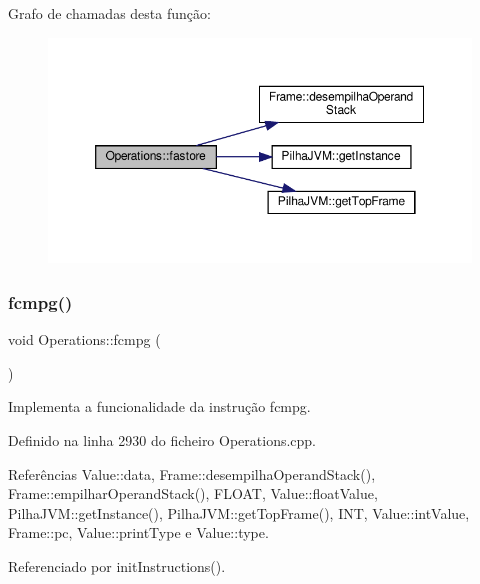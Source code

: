 Grafo de chamadas desta função\+:\nopagebreak
\begin{figure}[H]
\begin{center}
\leavevmode
\includegraphics[width=350pt]{classOperations_aa8a2c3048379b9d5cdc2b4611ef86190_cgraph}
\end{center}
\end{figure}
\mbox{\label{classOperations_a7825305c331404b97ef209a6e6d988ab}} 
\subsubsection{\texorpdfstring{fcmpg()}{fcmpg()}}
{\footnotesize\ttfamily void Operations\+::fcmpg (\begin{DoxyParamCaption}{ }\end{DoxyParamCaption})\hspace{0.3cm}{\ttfamily [private]}}



Implementa a funcionalidade da instrução fcmpg. 



Definido na linha 2930 do ficheiro Operations.\+cpp.



Referências Value\+::data, Frame\+::desempilha\+Operand\+Stack(), Frame\+::empilhar\+Operand\+Stack(), F\+L\+O\+AT, Value\+::float\+Value, Pilha\+J\+V\+M\+::get\+Instance(), Pilha\+J\+V\+M\+::get\+Top\+Frame(), I\+NT, Value\+::int\+Value, Frame\+::pc, Value\+::print\+Type e Value\+::type.



Referenciado por init\+Instructions().

